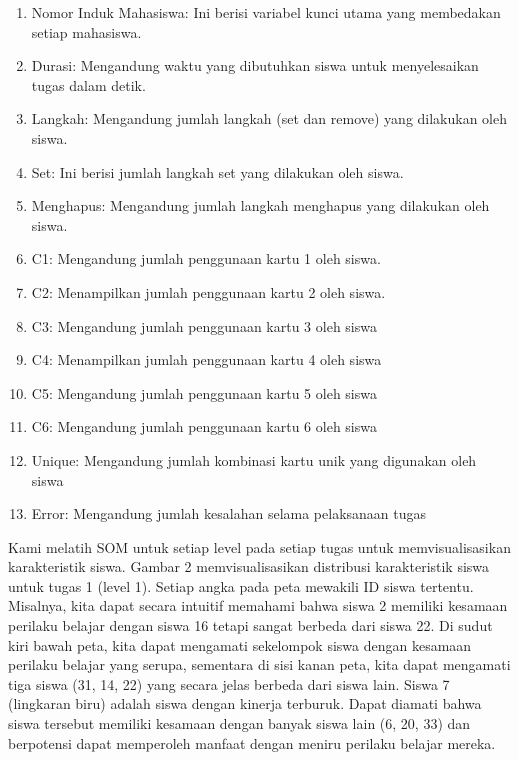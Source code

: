     \begin{enumerate}
        \item Nomor Induk Mahasiswa: Ini berisi variabel kunci utama yang membedakan setiap mahasiswa.
        \item Durasi: Mengandung waktu yang dibutuhkan siswa untuk menyelesaikan tugas dalam detik.
        \item Langkah: Mengandung jumlah langkah (set dan remove) yang dilakukan oleh siswa.
        \item Set: Ini berisi jumlah langkah set yang dilakukan oleh siswa.
        \item Menghapus: Mengandung jumlah langkah menghapus yang dilakukan oleh siswa.
        \item C1: Mengandung jumlah penggunaan kartu 1 oleh siswa.
        \item C2: Menampilkan jumlah penggunaan kartu 2 oleh siswa.
        \item C3: Mengandung jumlah penggunaan kartu 3 oleh siswa
        \item C4: Menampilkan jumlah penggunaan kartu 4 oleh siswa
        \item C5: Mengandung jumlah penggunaan kartu 5 oleh siswa
        \item C6: Mengandung jumlah penggunaan kartu 6 oleh siswa
        \item Unique: Mengandung jumlah kombinasi kartu unik yang digunakan oleh siswa
        \item Error: Mengandung jumlah kesalahan selama pelaksanaan tugas
    \end{enumerate}

    Kami melatih SOM untuk setiap level pada setiap tugas untuk memvisualisasikan karakteristik siswa. Gambar 2 memvisualisasikan distribusi karakteristik siswa untuk tugas 1 (level 1). Setiap angka pada peta mewakili ID siswa tertentu. Misalnya, kita dapat secara intuitif memahami bahwa siswa 2 memiliki kesamaan perilaku belajar dengan siswa 16 tetapi sangat berbeda dari siswa 22. Di sudut kiri bawah peta, kita dapat mengamati sekelompok siswa dengan kesamaan perilaku belajar yang serupa, sementara di sisi kanan peta, kita dapat mengamati tiga siswa (31, 14, 22) yang secara jelas berbeda dari siswa lain. Siswa 7 (lingkaran biru) adalah siswa dengan kinerja terburuk. Dapat diamati bahwa siswa tersebut memiliki kesamaan dengan banyak siswa lain (6, 20, 33) dan berpotensi dapat memperoleh manfaat dengan meniru perilaku belajar mereka.

